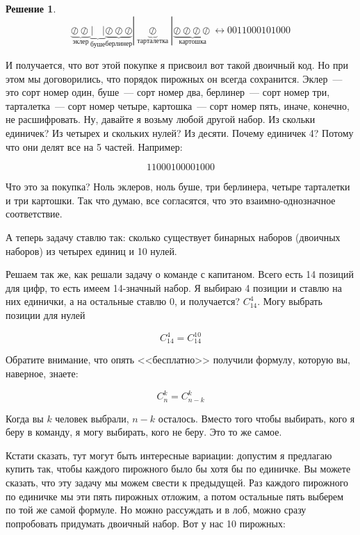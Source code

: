 \documentclass[russian]{lecture-notes}
\theoremstyle{definition}
\newtheorem*{solution}{Решение}
\begin{document}
\begin{enumerate}
\begin{solution}
			\[
				\underbrace{\oslash \oslash}_{\text{эклер}}  \underbrace{| \ \ \ \ |}_{\text{буше}} \underbrace{\oslash \oslash \oslash}_{\text{берлинер}} | \underbrace{\oslash}_{\text{тарталетка}} | \underbrace{\oslash \oslash \oslash \oslash}_{\text{картошка}} \longleftrightarrow 0011000101000
			\]
			
			И получается, что вот этой покупке я присвоил вот такой двоичный код. Но при этом мы договорились, что порядок пирожных он всегда сохранится. Эклер~--- это сорт номер один, буше~--- сорт номер два, берлинер~--- сорт номер три, тарталетка~--- сорт номер четыре, картошка~--- сорт номер пять, иначе, конечно, не расшифровать. Ну, давайте я возьму любой другой набор. Из скольки единичек? Из четырех и скольких нулей? Из десяти. Почему единичек 4? Потому что они делят все на 5 частей. Например:
			
			\[
				1 1 0 0 0 1 0 0 0 0 1 0 0 0
			\]
			
			Что это за покупка? Ноль эклеров, ноль буше, три берлинера, четыре тарталетки и три картошки. Так что думаю, все согласятся, что это взаимно-однозначное соответствие.
			
			
			А теперь задачу ставлю так: сколько существует бинарных наборов (двоичных наборов) из четырех единиц и 10 нулей.
			
			Решаем так же, как решали задачу о команде с капитаном. Всего есть 14 позиций для цифр, то есть имеем 14-значный набор. Я выбираю 4 позиции и ставлю на них единички, а на остальные ставлю 0, и получается? $C_{14}^4$. Могу выбрать позиции для нулей
			
			\[
				C_{14}^4 = C_{14}^{10}
			\]
			
		\end{solution}
	
		Обратите внимание, что опять <<бесплатно>> получили формулу, которую вы, наверное, знаете:
		
		\[
		C_n^k = C_{n-k}^k
		\]
		
		Когда вы $k$ человек выбрали, $n - k$ осталось. Вместо того чтобы выбирать, кого я беру в команду, я могу выбирать, кого не беру. Это то же самое.
		
		Кстати сказать, тут могут быть интересные вариации: допустим я предлагаю купить так, чтобы каждого пирожного было бы хотя бы по единичке. Вы можете сказать, что эту задачу мы можем свести к предыдущей. Раз каждого пирожного по единичке мы эти пять пирожных отложим, а потом остальные пять выберем по той же самой формуле. Но можно рассуждать и в лоб, можно сразу попробовать придумать двоичный набор. Вот у нас 10 пирожных:
		

\end{enumerate}
\end{document}
